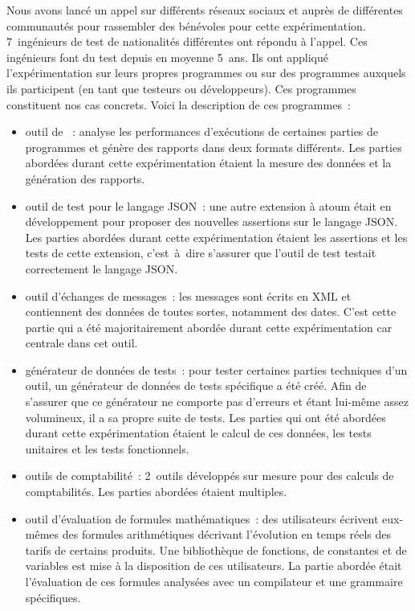 Nous avons lancé un appel sur différents réseaux sociaux et auprès de
différentes communautés pour rassembler des bénévoles pour cette
expérimentation. 7~ingénieurs de test de nationalités différentes ont répondu à
l'appel. Ces ingénieurs font du test depuis en moyenne 5~ans. Ils ont appliqué
l'expérimentation sur leurs propres programmes ou sur des programmes auxquels
ils participent (en tant que testeurs ou développeurs). Ces programmes
constituent nos cas concrets. Voici la description de ces programmes~:
%
\begin{itemize}

\item outil de ~: analyse les performances d'exécutions de
certaines parties de programmes et génère des rapports dans deux formats
différents. Les parties abordées durant cette expérimentation étaient la mesure
des données et la génération des rapports.

\item outil de test pour le langage JSON~: une autre extension à atoum était en
développement pour proposer des nouvelles assertions sur le langage JSON. Les
parties abordées durant cette expérimentation étaient les assertions et les
tests de cette extension, c'est~à~dire s'assurer que l'outil de test testait
correctement le langage JSON.

\item outil d'échanges de messages~: les messages sont écrits en XML et
contiennent des données de toutes sortes, notamment des dates. C'est cette
partie qui a été majoritairement abordée durant cette expérimentation car
centrale dans cet outil.

\item générateur de données de tests~: pour tester certaines parties techniques
d'un outil, un générateur de données de tests spécifique a été créé. Afin de
s'assurer que ce générateur ne comporte pas d'erreurs et étant lui-même assez
volumineux, il a sa propre suite de tests. Les parties qui ont été abordées
durant cette expérimentation étaient le calcul de ces données, les tests
unitaires et les tests fonctionnels.

\item outils de comptabilité~: 2~outils développés sur mesure pour des calculs
de comptabilités. Les parties abordées étaient multiples.

\item outil d'évaluation de formules mathématiques~: des utilisateurs écrivent
eux-mêmes des formules arithmétiques décrivant l'évolution en temps réels des
tarifs de certains produits. Une bibliothèque de fonctions, de constantes et de
variables est mise à la disposition de ces utilisateurs. La partie abordée était
l'évaluation de ces formules analysées avec un compilateur et une grammaire
spécifiques.

\end{itemize}

